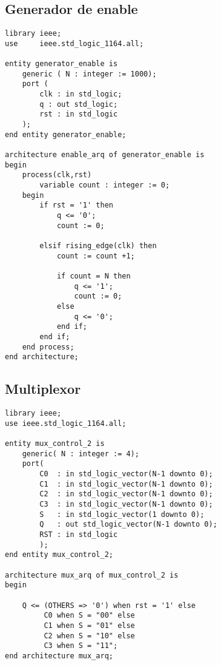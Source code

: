 \documentclass[10pt,a4paper]{article}
\begin{document}
\subsection*{Generador de enable}
\begin{center}
\begin{verbatim}
library ieee;
use     ieee.std_logic_1164.all;

entity generator_enable is
    generic ( N : integer := 1000);
    port (
        clk : in std_logic;
        q : out std_logic;
        rst : in std_logic
    );
end entity generator_enable;

architecture enable_arq of generator_enable is
begin
    process(clk,rst)
        variable count : integer := 0;
    begin
        if rst = '1' then
            q <= '0';
            count := 0;

        elsif rising_edge(clk) then
            count := count +1;

            if count = N then
                q <= '1';
                count := 0;
            else
                q <= '0';
            end if;
        end if;
    end process;
end architecture;
\end{verbatim}
\end{center}
\subsection*{Multiplexor}
\begin{center}
\begin{verbatim}
library ieee;
use ieee.std_logic_1164.all;

entity mux_control_2 is
    generic( N : integer := 4);
    port(
        C0  : in std_logic_vector(N-1 downto 0);
        C1  : in std_logic_vector(N-1 downto 0);
        C2  : in std_logic_vector(N-1 downto 0);
        C3  : in std_logic_vector(N-1 downto 0);
        S   : in std_logic_vector(1 downto 0);
        Q   : out std_logic_vector(N-1 downto 0);
        RST : in std_logic
        );
end entity mux_control_2;

architecture mux_arq of mux_control_2 is
begin

    Q <= (OTHERS => '0') when rst = '1' else
         C0 when S = "00" else
         C1 when S = "01" else
         C2 when S = "10" else
         C3 when S = "11";
end architecture mux_arq;
\end{verbatim}
\end{center}
\end{document}
